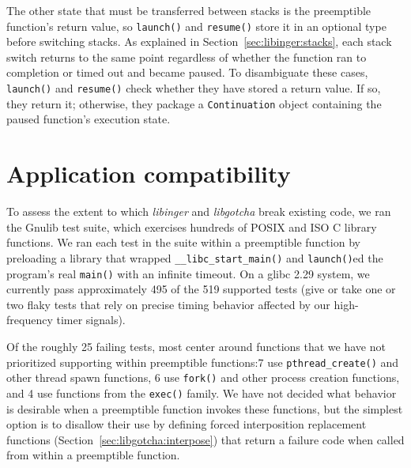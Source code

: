 The other state that must be transferred between stacks is the preemptible function's
return value, so \texttt{launch()} and \texttt{resume()} store it in an optional type
before switching stacks.  As explained in Section~\ref{sec:libinger:stacks}, each
stack switch returns to the same point regardless of whether the function ran to
completion or timed out and became paused.  To disambiguate these cases,
\texttt{launch()} and \texttt{resume()} check whether they have stored a return
value.  If so, they return it; otherwise, they package a \texttt{Continuation} object
containing the paused function's execution state.


\section{Application compatibility}
\label{sec:libinger:compatibility}

To assess the extent to which \textit{libinger} and \textit{libgotcha} break existing
code, we ran the Gnulib test suite, which exercises hundreds of POSIX and ISO C
library functions.  We ran each test in the suite within a preemptible function by
preloading a library that wrapped \texttt{\_\_libc\_start\_main()} and
\texttt{launch()}ed the program's real \texttt{main()} with an infinite timeout.  On
a glibc 2.29 system, we currently pass approximately 495 of the 519 supported tests
(give or take one or two flaky tests that rely on precise timing behavior affected by
our high-frequency timer signals).

Of the roughly 25 failing tests, most center around functions that we have not
prioritized supporting within preemptible functions:\@ 7 use
\texttt{pthread\_create()} and other thread spawn functions, 6 use \texttt{fork()}
and other process creation functions, and 4 use functions from the \texttt{exec()}
family.  We have not decided what behavior is desirable when a preemptible function
invokes these functions, but the simplest option is to disallow their use by defining
forced interposition replacement functions (Section~\ref{sec:libgotcha:interpose})
that return a failure code when called from within a preemptible function.

